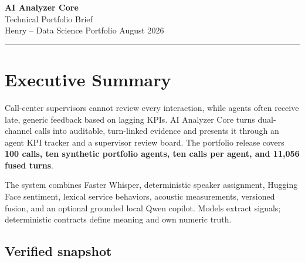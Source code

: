 \documentclass[11pt,letterpaper]{article}
\begin{document}
\begin{center}
{\LARGE\color{navy}\textbf{AI Analyzer Core}}\\[3pt]
{\large Technical Portfolio Brief}\\[4pt]
Henry -- Data Science Portfolio \hfill August 2026
\end{center}
\vspace{3pt}
\hrule
\vspace{7pt}

\section*{Executive Summary}

Call-center supervisors cannot review every interaction, while agents often receive
late, generic feedback based on lagging KPIs. AI Analyzer Core turns dual-channel calls
into auditable, turn-linked evidence and presents it through an agent KPI tracker and a
supervisor review board. The portfolio release covers \textbf{100 calls, ten synthetic
portfolio agents, ten calls per agent, and 11,056 fused turns}.

The system combines Faster Whisper, deterministic speaker assignment, Hugging Face
sentiment, lexical service behaviors, acoustic measurements, versioned fusion, and an
optional grounded local Qwen copilot. Models extract signals; deterministic contracts
define meaning and own numeric truth.


\subsection*{Verified snapshot}
\end{document}
